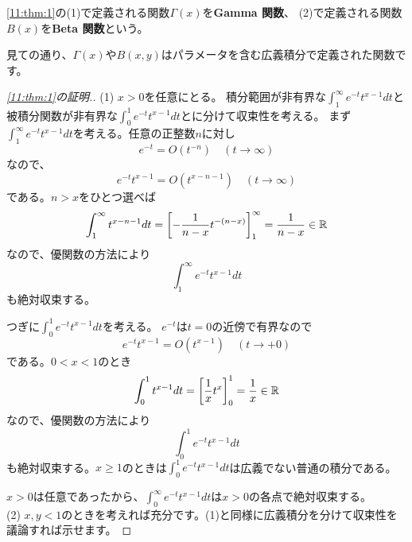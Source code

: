 \documentclass[report]{jlreq}
\begin{document}
\begin{definition}
    \cref{11:thm:1}の(1)で定義される関数$\Gamma(x)$を\textbf{Gamma 関数}、
    (2)で定義される関数$B(x)$を\textbf{Beta 関数}という。
\end{definition}

見ての通り、$\Gamma(x)$や$B(x, y)$はパラメータを含む広義積分で定義された関数です。

\begin{proof}[\cref{11:thm:1}の証明.]
    (1)
    $x > 0$を任意にとる。
    積分範囲が非有界な$\int_1^\infty e^{-t} t^{x-1} dt$と
    被積分関数が非有界な$\int_0^1 e^{-t} t^{x-1} dt$とに分けて収束性を考える。
    まず$\int_1^\infty e^{-t} t^{x-1} dt$を考える。任意の正整数$n$に対し
    \begin{equation}
        e^{-t} = O(t^{-n})\quad (t \to \infty)
    \end{equation}
    なので、
    \begin{equation}
        e^{-t} t^{x-1} = O(t^{x-n-1})\quad (t \to \infty)
    \end{equation}
    である。$n > x$をひとつ選べば
    \begin{equation}
        \int_1^\infty t^{x-n-1} dt
            = \left[ -\frac{1}{n-x} t^{-(n-x)} \right]_1^\infty
            = \frac{1}{n - x}
            \in \mathbb{R}
    \end{equation}
    なので、優関数の方法により
    \begin{equation}
        \int_1^\infty e^{-t} t^{x - 1} dt
    \end{equation}
    も絶対収束する。

    つぎに$\int_0^1 e^{-t} t^{x-1} dt$を考える。
    $e^{-t}$は$t = 0$の近傍で有界なので
    \begin{equation}
        e^{-t} t^{x-1} = O(t^{x-1})\quad (t \to +0)
    \end{equation}
    である。$0 < x < 1$のとき
    \begin{equation}
        \int_0^1 t^{x-1} dt
            = \left[ \frac{1}{x} t^{x} \right]_0^1
            = \frac{1}{x}
            \in \mathbb{R}
    \end{equation}
    なので、優関数の方法により
    \begin{equation}
        \int_0^1 e^{-t} t^{x - 1} dt
    \end{equation}
    も絶対収束する。$x \ge 1$のときは$\int_0^1 e^{-t} t^{x-1} dt$は広義でない普通の積分である。

    $x > 0$は任意であったから、$\int_0^\infty e^{-t} t^{x - 1} dt$は$x > 0$の各点で絶対収束する。
    \\

    (2) $x, y < 1$のときを考えれば充分です。(1)と同様に広義積分を分けて収束性を議論すれば示せます。
\end{proof}
\end{document}

